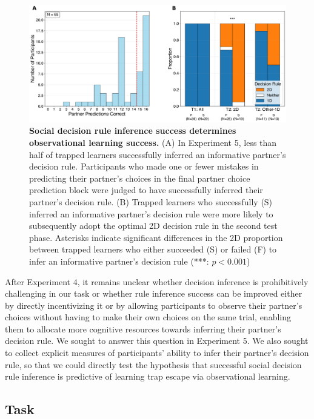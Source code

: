 \documentclass[11pt]{article} %
\begin{document}
\begin{figure}
    \centering
    \includegraphics[width=0.9 \linewidth]{partner_prediction_combined_figure.pdf}
    \caption{\textbf{Social decision rule inference success determines observational learning success.} (A) In Experiment 5, less than half of trapped learners successfully inferred an informative partner's decision rule. Participants who made one or fewer mistakes in predicting their partner's choices in the final partner choice prediction block were judged to have successfully inferred their partner's decision rule. (B) Trapped learners who successfully (S) inferred an informative partner's decision rule were more likely to subsequently adopt the optimal 2D decision rule in the second test phase. Asterisks indicate significant differences in the 2D proportion between trapped learners who either succeeded (S) or failed (F) to infer an informative partner's decision rule (***: $p < 0.001$)} %
    \label{fig:partner-prediction}
\end{figure}

After Experiment 4, it remains unclear whether decision inference is prohibitively challenging in our task or whether rule inference success can be improved either by directly incentivizing it or by allowing participants to observe their partner's choices without having to make their own choices on the same trial, enabling them to allocate more cognitive resources towards inferring their partner's decision rule. We sought to answer this question in Experiment 5. We also sought to collect explicit measures of participants' ability to infer their partner's decision rule, so that we could directly test the hypothesis that successful social decision rule inference is predictive of learning trap escape via observational learning.

\subsection{Task}
\end{document}
